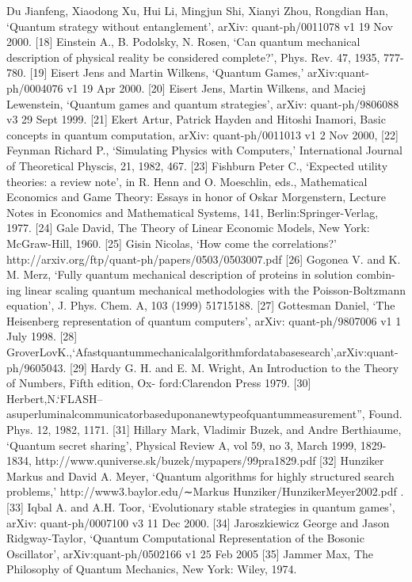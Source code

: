 \begin{verbatim*}
[17] Du Jianfeng, Xiaodong Xu, Hui Li, Mingjun Shi, Xianyi Zhou, Rongdian Han, ‘Quantum strategy
without entanglement’, arXiv: quant-ph/0011078 v1 19 Nov 2000.
[18] Einstein A., B. Podolsky, N. Rosen, ‘Can quantum mechanical description of physical reality be
considered complete?’, Phys. Rev. 47, 1935, 777-780.
[19] Eisert Jens and Martin Wilkens, ‘Quantum Games,’ arXiv:quant-ph/0004076 v1 19 Apr 2000.
[20] Eisert Jens, Martin Wilkens, and Maciej Lewenstein, ‘Quantum games and quantum strategies’,
arXiv: quant-ph/9806088 v3 29 Sept 1999.
[21] Ekert Artur, Patrick Hayden and Hitoshi Inamori, Basic concepts in quantum computation, arXiv:
quant-ph/0011013 v1 2 Nov 2000,
[22] Feynman Richard P., ‘Simulating Physics with Computers,’ International Journal of Theoretical
Physcis, 21, 1982, 467.
[23] Fishburn Peter C., ‘Expected utility theories: a review note’, in R. Henn and O. Moeschlin, eds.,
Mathematical Economics and Game Theory: Essays in honor of Oskar Morgenstern, Lecture Notes
in Economics and Mathematical Systems, 141, Berlin:Springer-Verlag, 1977.
[24] Gale David, The Theory of Linear Economic Models, New York: McGraw-Hill, 1960.
[25] Gisin Nicolas, ‘How come the correlations?’ http://arxiv.org/ftp/quant-ph/papers/0503/0503007.pdf
[26] Gogonea V. and K. M. Merz, ‘Fully quantum mechanical description of proteins in solution combin-
ing linear scaling quantum mechanical methodologies with the Poisson-Boltzmann equation’, J. Phys. Chem. A, 103 (1999) 51715188.
[27] Gottesman Daniel, ‘The Heisenberg representation of quantum computers’, arXiv: quant-ph/9807006 v1 1 July 1998.
[28] GroverLovK.,‘Afastquantummechanicalalgorithmfordatabasesearch’,arXiv:quant-ph/9605043.
[29] Hardy G. H. and E. M. Wright, An Introduction to the Theory of Numbers, Fifth edition, Ox-
ford:Clarendon Press 1979.
[30] Herbert,N.‘FLASH–asuperluminalcommunicatorbaseduponanewtypeofquantummeasurement”,
Found. Phys. 12, 1982, 1171.
[31] Hillary Mark, Vladimir Buzek, and Andre Berthiaume, ‘Quantum secret sharing’, Physical Review A,
vol 59, no 3, March 1999, 1829-1834, http://www.quniverse.sk/buzek/mypapers/99pra1829.pdf
[32] Hunziker Markus and David A. Meyer, ‘Quantum algorithms for highly structured search problems,’
http://www3.baylor.edu/∼Markus Hunziker/HunzikerMeyer2002.pdf .
[33] Iqbal A. and A.H. Toor, ‘Evolutionary stable strategies in quantum games’, arXiv: quant-ph/0007100
v3 11 Dec 2000.
[34] Jaroszkiewicz George and Jason Ridgway-Taylor, ‘Quantum Computational Representation of the
Bosonic Oscillator’, arXiv:quant-ph/0502166 v1 25 Feb 2005
[35] Jammer Max, The Philosophy of Quantum Mechanics, New York: Wiley, 1974.

\end{verbatim*}
